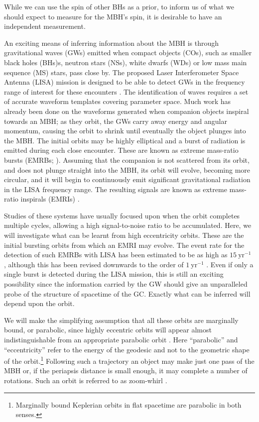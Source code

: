 \documentclass[useAMS,usedcolumn,usegraphicx,usenatbib]{mn2e}
\newcommand{\units}[1]{\ensuremath{~\mathrm{#1}}}
\begin{document}
While we can use the spin of other BHs as a prior, to inform us of what we should expect to measure for the MBH's spin, it is desirable to have an independent measurement.

An exciting means of inferring information about the MBH is through gravitational waves (GWs) emitted when compact objects (COs), such as smaller black holes (BHs)s, neutron stars (NSs), white dwarfs (WDs) or low mass main sequence (MS) stars, pass close by. The proposed Laser Interferometer Space Antenna (LISA) mission is designed to be able to detect GWs in the frequency range of interest for these encounters \citep{Bender1998, Danzmann2003}. The identification of waves requires a set of accurate waveform templates covering parameter space. Much work has already been done on the waveforms generated when companion objects inspiral towards an MBH; as they orbit, the GWs carry away energy and angular momentum, causing the orbit to shrink until eventually the object plunges into the MBH. The initial orbits may be highly elliptical and a burst of radiation is emitted during each close encounter. These are known as extreme mass-ratio bursts (EMRBs; \citealt{Rubbo2006}). Assuming that the companion is not scattered from its orbit, and does not plunge straight into the MBH, its orbit will evolve, becoming more circular, and it will begin to continuously emit significant gravitational radiation in the LISA frequency range. The resulting signals are known as extreme mass-ratio inspirals (EMRIs) \citep{Amaro-Seoane2007}.

Studies of these systems have usually focused upon when the orbit completes multiple cycles, allowing a high signal-to-noise ratio to be accumulated. Here, we will investigate what can be learnt from high eccentricity orbits. These are the initial bursting orbits from which an EMRI may evolve. The event rate for the detection of such EMRBs with LISA has been estimated to be as high as $15\units{yr^{-1}}$ \citep{Rubbo2006}, although this has been revised downwards to the order of $1\units{yr^{-1}}$ \citep{Hopman2007}. Even if only a single burst is detected during the LISA mission, this is still an exciting possibility since the information carried by the GW should give an unparalleled probe of the structure of spacetime of the GC. Exactly what can be inferred will depend upon the orbit.

We will make the simplifying assumption that all these orbits are marginally bound, or parabolic, since highly eccentric orbits will appear almost indistinguishable from an appropriate parabolic orbit \citep{Kobayashi2004}. Here ``parabolic'' and ``eccentricity'' refer to the energy of the geodesic and not to the geometric shape of the orbit.\footnote{Marginally bound Keplerian orbits in flat spacetime are parabolic in both senses.} Following such a trajectory an object may make just one pass of the MBH or, if the periapsis distance is small enough, it may complete a number of rotations. Such an orbit is referred to as zoom-whirl \citep{Glampedakis2002a}.
\end{document}
